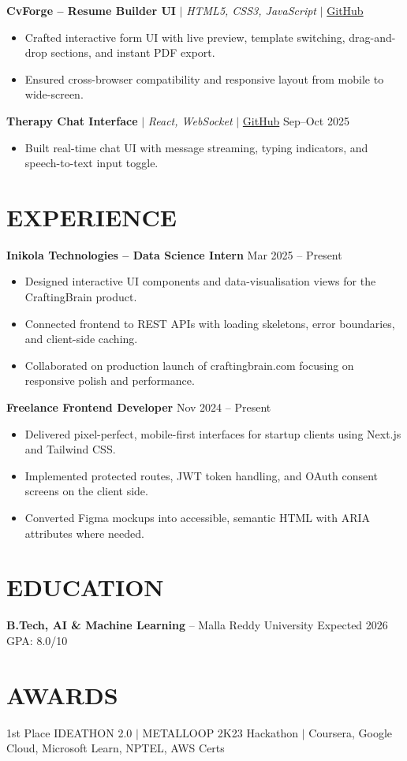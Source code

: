 \documentclass[10pt]{article}
\begin{document}
\textbf{CvForge -- Resume Builder UI} $|$ \textit{HTML5, CSS3, JavaScript} $|$ \href{https://github.com/JeetInTech/CvForge-Online}{GitHub}
\begin{itemize}
\item Crafted interactive form UI with live preview, template switching, drag-and-drop sections, and instant PDF export.
\item Ensured cross-browser compatibility and responsive layout from mobile to wide-screen.
\end{itemize}

\textbf{Therapy Chat Interface} $|$ \textit{React, WebSocket} $|$ \href{https://github.com/JeetInTech/Virtual-Therapist---LangGraph-Agentic-AI-System}{GitHub} \hfill Sep--Oct 2025
\begin{itemize}
\item Built real-time chat UI with message streaming, typing indicators, and speech-to-text input toggle.
\end{itemize}

\section*{EXPERIENCE}
\textbf{Inikola Technologies -- Data Science Intern} \hfill Mar 2025 -- Present
\begin{itemize}
\item Designed interactive UI components and data-visualisation views for the CraftingBrain product.
\item Connected frontend to REST APIs with loading skeletons, error boundaries, and client-side caching.
\item Collaborated on production launch of craftingbrain.com focusing on responsive polish and performance.
\end{itemize}

\textbf{Freelance Frontend Developer} \hfill Nov 2024 -- Present
\begin{itemize}
\item Delivered pixel-perfect, mobile-first interfaces for startup clients using Next.js and Tailwind CSS.
\item Implemented protected routes, JWT token handling, and OAuth consent screens on the client side.
\item Converted Figma mockups into accessible, semantic HTML with ARIA attributes where needed.
\end{itemize}

\section*{EDUCATION}
\textbf{B.Tech, AI \& Machine Learning} -- Malla Reddy University \hfill Expected 2026 \hfill GPA: 8.0/10

\section*{AWARDS}
1st Place IDEATHON 2.0 $|$ METALLOOP 2K23 Hackathon $|$ Coursera, Google Cloud, Microsoft Learn, NPTEL, AWS Certs
\end{document}
